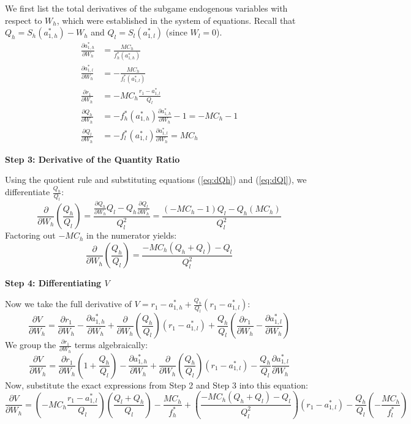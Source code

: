 \documentclass[12pt, a4paper]{article}
\begin{document}
We first list the total derivatives of the subgame endogenous variables with respect to $W_h$, which were established in the system of equations. Recall that $Q_h = S_h(a_{1,h}^*) - W_h$ and $Q_l = S_l(a_{1,l}^*)$ (since $W_l = 0$).
\begin{align}
    \frac{\partial a_{1,h}^*}{\partial W_h} &= \frac{MC_h}{f_h^*(a_{1,h}^*)} \label{eq:da_h} \\
    \frac{\partial a_{1,l}^*}{\partial W_h} &= -\frac{MC_h}{f_l^*(a_{1,l}^*)} \label{eq:da_l} \\
    \frac{\partial r_1}{\partial W_h} &= -MC_h \frac{r_1 - a_{1,l}^*}{Q_l} \label{eq:dr1} \\
    \frac{\partial Q_h}{\partial W_h} &= -f_h^*(a_{1,h}^*) \frac{\partial a_{1,h}^*}{\partial W_h} - 1 = -MC_h - 1 \label{eq:dQh} \\
    \frac{\partial Q_l}{\partial W_h} &= -f_l^*(a_{1,l}^*) \frac{\partial a_{1,l}^*}{\partial W_h} = MC_h \label{eq:dQl}
\end{align}

\textbf{Step 3: Derivative of the Quantity Ratio}

Using the quotient rule and substituting equations (\ref{eq:dQh}) and (\ref{eq:dQl}), we differentiate $\frac{Q_h}{Q_l}$:
\[
    \frac{\partial}{\partial W_h} \left( \frac{Q_h}{Q_l} \right) = \frac{\frac{\partial Q_h}{\partial W_h} Q_l - Q_h \frac{\partial Q_l}{\partial W_h}}{Q_l^2} = \frac{(-MC_h - 1)Q_l - Q_h(MC_h)}{Q_l^2}
\]
Factoring out $-MC_h$ in the numerator yields:
\[
    \frac{\partial}{\partial W_h} \left( \frac{Q_h}{Q_l} \right) = \frac{-MC_h(Q_h + Q_l) - Q_l}{Q_l^2}
\]

\textbf{Step 4: Differentiating $V$}

Now we take the full derivative of $V = r_1 - a_{1,h}^* + \frac{Q_h}{Q_l}(r_1 - a_{1,l}^*)$:
\[
    \frac{\partial V}{\partial W_h} = \frac{\partial r_1}{\partial W_h} - \frac{\partial a_{1,h}^*}{\partial W_h} + \frac{\partial}{\partial W_h}\left(\frac{Q_h}{Q_l}\right)(r_1 - a_{1,l}^*) + \frac{Q_h}{Q_l}\left(\frac{\partial r_1}{\partial W_h} - \frac{\partial a_{1,l}^*}{\partial W_h}\right)
\]
We group the $\frac{\partial r_1}{\partial W_h}$ terms algebraically:
\[
    \frac{\partial V}{\partial W_h} = \frac{\partial r_1}{\partial W_h} \left( 1 + \frac{Q_h}{Q_l} \right) - \frac{\partial a_{1,h}^*}{\partial W_h} + \frac{\partial}{\partial W_h}\left(\frac{Q_h}{Q_l}\right)(r_1 - a_{1,l}^*) - \frac{Q_h}{Q_l} \frac{\partial a_{1,l}^*}{\partial W_h}
\]
Now, substitute the exact expressions from Step 2 and Step 3 into this equation:
\[
    \frac{\partial V}{\partial W_h} = \left( -MC_h \frac{r_1 - a_{1,l}^*}{Q_l} \right) \left( \frac{Q_l + Q_h}{Q_l} \right) - \frac{MC_h}{f_h^*} + \left( \frac{-MC_h(Q_h + Q_l) - Q_l}{Q_l^2} \right) (r_1 - a_{1,l}^*) - \frac{Q_h}{Q_l} \left( -\frac{MC_h}{f_l^*} \right)
\]
\end{document}
